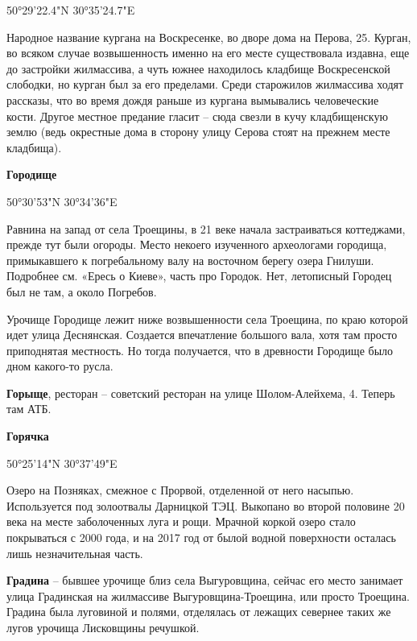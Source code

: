50°29'22.4"N 30°35'24.7"E

Народное название кургана на Воскресенке, во дворе дома на Перова, 25. Курган, во всяком случае возвышенность именно на его месте существовала издавна, еще до застройки жилмассива, а чуть южнее находилось кладбище Воскресенской слободки, но курган был за его пределами. Среди старожилов жилмассива ходят рассказы, что во время дождя раньше из кургана вымывались человеческие кости. Другое местное предание гласит – сюда свезли в кучу кладбищенскую землю (ведь окрестные дома в сторону улицу Серова стоят на прежнем месте кладбища).\\

\medskip


\textbf{Городище}

50°30'53"N 30°34'36"E

Равнина на запад от села Троещины, в 21 веке начала застраиваться коттеджами, прежде тут были огороды. Место некоего изученного археологами городища, примыкавшего к погребальному валу на восточном берегу озера Гнилуши. Подробнее см. «Ересь о Киеве», часть про Городок. Нет, летописный Городец был не там, а около Погребов.

Урочище Городище лежит ниже возвышенности села Троещина, по краю которой идет улица Деснянская. Создается впечатление большого вала, хотя там просто приподнятая местность. Но тогда получается, что в древности Городище было дном какого-то русла.\\

\medskip

\textbf{Горыще}, ресторан – советский ресторан на улице Шолом-Алейхема, 4. Теперь там АТБ.\\

\medskip

\textbf{Горячка}

50°25'14"N 30°37'49"E

Озеро на Позняках, смежное с Прорвой, отделенной от него насыпью. Используется под золоотвалы Дарницкой ТЭЦ. Выкопано во второй половине 20 века на месте заболоченных луга и рощи. Мрачной коркой озеро стало покрываться с 2000 года, и на 2017 год от былой водной поверхности осталась лишь незначительная часть.\\

\medskip

\textbf{Градина} – бывшее урочище близ села Выгуровщина, сейчас его место занимает улица Градинская на жилмассиве Выгуровщина-Троещина, или просто Троещина. Градина была луговиной и полями, отделялась от лежащих севернее таких же лугов урочища Лисковщины речушкой.
